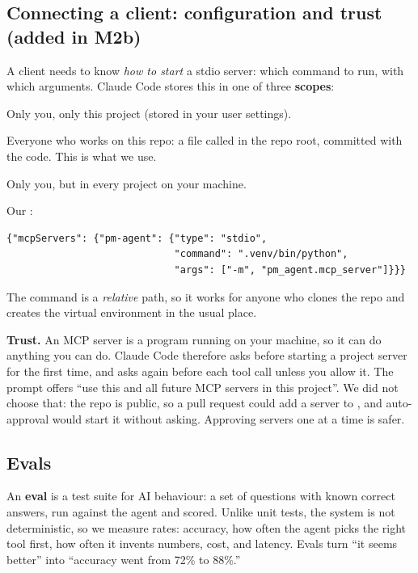 \documentclass[11pt]{article}
\newcommand{\code}[1]{\texttt{\detokenize{#1}}}
\begin{document}
\subsection{Connecting a client: configuration and trust (added in M2b)}

A client needs to know \emph{how to start} a stdio server: which command to run, with which
arguments. Claude Code stores this in one of three \textbf{scopes}:

\begin{description}[style=nextline]
  \item[Local] Only you, only this project (stored in your user settings).
  \item[Project] Everyone who works on this repo: a file called \code{.mcp.json} in the repo
        root, committed with the code. This is what we use.
  \item[User] Only you, but in every project on your machine.
\end{description}

Our \code{.mcp.json}:

\begin{lstlisting}[style=plain]
{"mcpServers": {"pm-agent": {"type": "stdio",
                             "command": ".venv/bin/python",
                             "args": ["-m", "pm_agent.mcp_server"]}}}
\end{lstlisting}

The command is a \emph{relative} path, so it works for anyone who clones the repo and creates
the virtual environment in the usual place.

\textbf{Trust.} An MCP server is a program running on your machine, so it can do anything
you can do. Claude Code therefore asks before starting a project server for the first time,
and asks again before each tool call unless you allow it. The prompt offers ``use this and all
future MCP servers in this project''. We did not choose that: the repo is public, so a pull
request could add a server to \code{.mcp.json}, and auto-approval would start it without
asking. Approving servers one at a time is safer.

\subsection{Evals}

An \textbf{eval} is a test suite for AI behaviour: a set of questions with known correct
answers, run against the agent and scored. Unlike unit tests, the system is not
deterministic, so we measure rates: accuracy, how often the agent picks the right tool first,
how often it invents numbers, cost, and latency. Evals turn ``it seems better'' into ``accuracy
went from 72\% to 88\%.''
\end{document}
